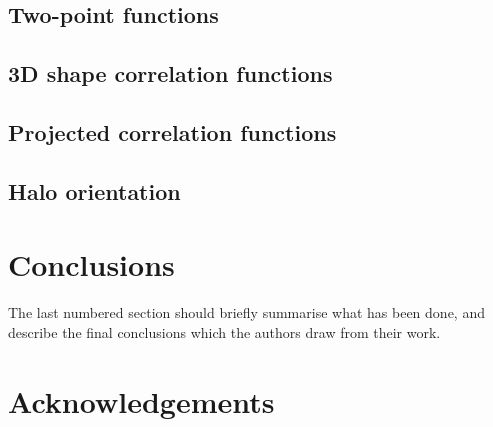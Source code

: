 \documentclass[a4paper,fleqn,usenatbib]{mnras}
\begin{document}
\subsection{Two-point functions}

	\subsection{3D shape correlation functions}

	\subsection{Projected correlation functions}

\subsection{Halo orientation}

\section{Conclusions}


The last numbered section should briefly summarise what has been done, and describe
the final conclusions which the authors draw from their work.

\section*{Acknowledgements}





%



%
%
%



\bsp	%
\label{lastpage}
\end{document}

